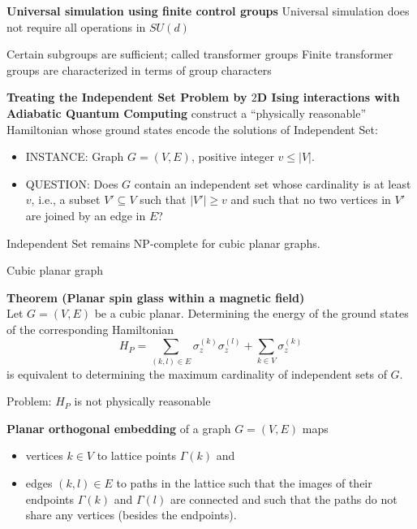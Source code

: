 \documentclass[portrait]{seminar}
\begin{document}
\begin{slide}
{\large {\bf Universal simulation using finite control groups}}
\vfill
{\blue Universal simulation} does not require all operations in $SU(d)$

Certain subgroups are sufficient; called {\blue transformer groups}
\vfill 
{\blue Finite transformer groups are characterized in terms of group 
characters} 
\vfill
\end{slide}

\begin{slide}
{\bf Treating the Independent Set Problem by $2$D Ising interactions with
Adiabatic Quantum Computing}
\vfill
construct a {\red ``physically reasonable''} Hamiltonian whose ground states
encode the solutions of Independent Set:
\bigskip
\begin{itemize}
\item INSTANCE: Graph $G=(V,E)$, positive integer $v\le |V|$.
\item QUESTION: Does $G$ contain an independent set whose cardinality
is at least $v$, i.e., a subset $V'\subseteq V$ such that $|V'|\ge v$
and such that no two vertices in $V'$ are joined by an edge in $E$?
\end{itemize}
Independent Set remains NP-complete for {\blue cubic planar} graphs.
\vfill
\end{slide}

\begin{slide}
Cubic planar graph
\centerline{
}
{\bf Theorem (Planar spin glass within a magnetic field)}\\
Let $G=(V,E)$ be a cubic planar. Determining the energy of the ground
states of the corresponding Hamiltonian
\begin{equation}
H_P=\sum_{(k,l)\in E} \sigma_z^{(k)}\sigma_z^{(l)} + \sum_{k\in V}
\sigma_z^{(k)}
\end{equation}
is equivalent to determining the maximum cardinality of independent
sets of $G$.

Problem: $H_P$ is {\red not physically reasonable}
\end{slide}

\begin{slide}
{\bf Planar orthogonal embedding} of a graph $G=(V,E)$ maps
\begin{itemize}
\item vertices $k\in V$ to lattice points $\Gamma(k)$ and 
\item edges $(k,l)\in E$ to paths in the lattice such that the images of
their endpoints $\Gamma(k)$ and $\Gamma(l)$ are connected and such
that the paths do not share any vertices (besides the endpoints).
\end{itemize}
\centerline{
}
\end{slide}
\end{document}
